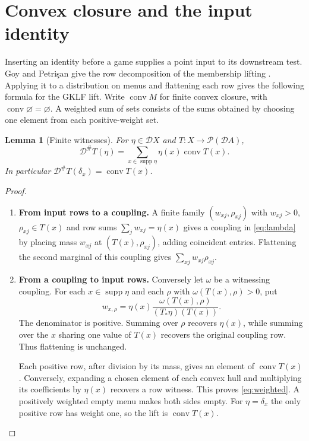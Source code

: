 \documentclass[11pt,a4paper]{article}
\newtheorem{lemma}[theorem]{Lemma}
\theoremstyle{definition}
\newcommand{\D}{\mathcal D}
\newcommand{\Pow}{\mathcal P}
\newcommand{\conv}{\operatorname{conv}}
\newcommand{\supp}{\operatorname{supp}}
\begin{document}
\section{Convex closure and the input identity}\label{sec:unit}

Inserting an identity before a game supplies a point input to its downstream test. Goy and Petri\c{s}an give the row decomposition of the membership lifting \cite[Lemma~3.1]{goy}. Applying it to a distribution on menus and flattening each row gives the following formula for the GKLF lift. Write $\conv M$ for finite convex closure, with $\conv\varnothing=\varnothing$. A weighted sum of sets consists of the sums obtained by choosing one element from each positive-weight set.

\begin{lemma}[Finite witnesses]\label{lem:lift}
    For $\eta\in\D X$ and $T:X\to\Pow(\D A)$,
    \begin{equation}
        \D^\# T(\eta)=
        \sum_{x\in\supp\eta}\eta(x)\conv T(x).
        \label{eq:weighted}
    \end{equation}
    In particular $\D^\# T(\delta_x)=\conv T(x)$.
\end{lemma}
\begin{proof}\leavevmode
    \begin{enumerate}[titledsteps]
        \item \textbf{From input rows to a coupling.} A finite family $(w_{xj},\rho_{xj})$ with $w_{xj}>0$, $\rho_{xj}\in T(x)$ and row sums $\sum_jw_{xj}=\eta(x)$ gives a coupling in \eqref{eq:lambda} by placing mass $w_{xj}$ at $(T(x),\rho_{xj})$, adding coincident entries. Flattening the second marginal of this coupling gives $\sum_{xj}w_{xj}\rho_{xj}$.

        \item \textbf{From a coupling to input rows.} Conversely let $\omega$ be a witnessing coupling. For each $x\in\supp\eta$ and each $\rho$ with $\omega(T(x),\rho)>0$, put
        \[
            w_{x,\rho}=\eta(x)\frac{\omega(T(x),\rho)}{(T_*\eta)(T(x))}.
        \]
        The denominator is positive. Summing over $\rho$ recovers $\eta(x)$, while summing over the $x$ sharing one value of $T(x)$ recovers the original coupling row. Thus flattening is unchanged.

        Each positive row, after division by its mass, gives an element of $\conv T(x)$. Conversely, expanding a chosen element of each convex hull and multiplying its coefficients by $\eta(x)$ recovers a row witness. This proves \eqref{eq:weighted}. A positively weighted empty menu makes both sides empty. For $\eta=\delta_x$ the only positive row has weight one, so the lift is $\conv T(x)$.\qedhere
    \end{enumerate}
\end{proof}
\end{document}
